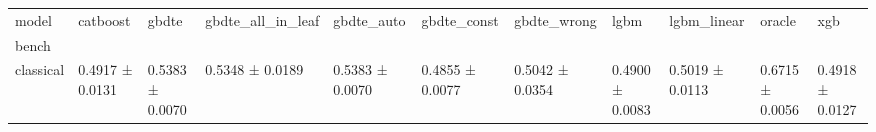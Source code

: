 \begin{tabular}{lllllllllll}
\toprule
model & catboost & gbdte & gbdte_all_in_leaf & gbdte_auto & gbdte_const & gbdte_wrong & lgbm & lgbm_linear & oracle & xgb \\
bench &  &  &  &  &  &  &  &  &  &  \\
\midrule
classical & 0.4917 ± 0.0131 & 0.5383 ± 0.0070 & 0.5348 ± 0.0189 & 0.5383 ± 0.0070 & 0.4855 ± 0.0077 & 0.5042 ± 0.0354 & 0.4900 ± 0.0083 & 0.5019 ± 0.0113 & 0.6715 ± 0.0056 & 0.4918 ± 0.0127 \\
\bottomrule
\end{tabular}
